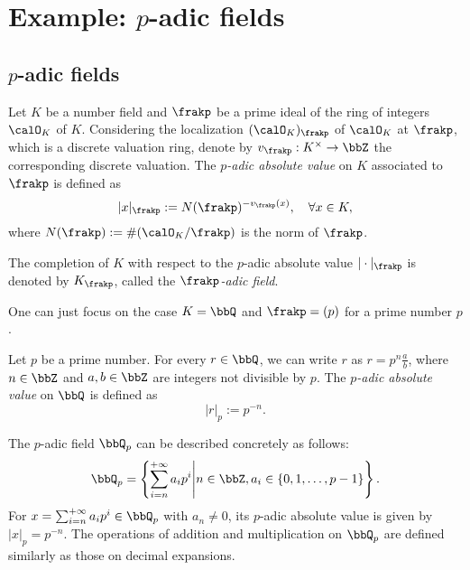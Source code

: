 \section[Example: p-adic fields]{Example: \(p\)-adic fields}

\subsection[p-adic fields]{\(p\)-adic fields}

    \begin{construction}\label{constr:p-adic_absolute_value_on_number_field}
        Let \(K\) be a number field and \(\frakp\) be a prime ideal of the ring of integers \(\calO_K\) of \(K\).
        Considering the localization \((\calO_K)_\frakp\) of \(\calO_K\) at \(\frakp\), which is a discrete valuation ring, denote by \(v_\frakp: K^\times \to \bbZ\) the corresponding discrete valuation.
        The \emph{\(p\)-adic absolute value} on \(K\) associated to \(\frakp\) is defined as
        \[ |x|_\frakp := N(\frakp)^{-v_\frakp(x)},\quad\forall x \in K, \]
        where \(N(\frakp) := \#(\calO_K / \frakp)\) is the norm of \(\frakp\).

        The completion of \(K\) with respect to the \(p\)-adic absolute value \(|\cdot|_\frakp\) is denoted by \(K_\frakp\), called the \emph{\(\frakp\)-adic field}.
    \end{construction}

    One can just focus on the case \(K = \bbQ\) and \(\frakp = (p)\) for a prime number \(p\).

    \begin{example}\label{eg:p-adic_field}
        Let \(p\) be a prime number. 
        For every \(r \in \bbQ\), we can write \(r\) as \(r = p^n \frac{a}{b}\), where \(n \in \bbZ\) and \(a,b \in \bbZ\) are integers not divisible by \(p\).
        The \emph{\(p\)-adic absolute value} on \(\bbQ\) is defined as
        \[ |r|_p := p^{-n}. \]
      
        The \(p\)-adic field \(\bbQ_p\) can be described concretely as follows:
        \[ \bbQ_p = \left\{ \sum_{i = n}^{+\infty} a_i p^i \middle| n \in \bbZ, a_i \in \{0, 1, \ldots, p-1\} \right\}. \]
        For \(x = \sum_{i = n}^{+\infty} a_i p^i \in \bbQ_p\) with \(a_n \neq 0\), its \(p\)-adic absolute value is given by \(|x|_p = p^{-n}\).
        The operations of addition and multiplication on \(\bbQ_p\) are defined similarly as those on decimal expansions.
    \end{example}

